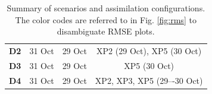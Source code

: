 \begin{table}[]
{{\begin{tabular}{cccc}
{\color[HTML]{FFCB2F} \textbf{D2}} & 31 Oct                 & 29 Oct                        & XP2 (29 Oct), XP5 (30 Oct)        \\
{\color[HTML]{6200C9} \textbf{D3}} & 31 Oct                 & 29 Oct                        & XP5 (30 Oct)                      \\
{\color[HTML]{009901} \textbf{D4}} & 31 Oct                 & 29 Oct                        & XP2, XP3, XP5 (29–-30 Oct)         \\ \hline
\end{tabular}%
}}
\caption{Summary of scenarios and assimilation configurations. The
  color codes are referred to in Fig. \ref{fig:rms} to
  disambiguate RMSE plots.}
\label{table:scenarios}
\end{table}